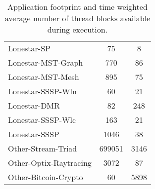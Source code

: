 \begin{table}[t]
\begin{small}
\begin{tabular}{lcc}
Lonestar-SP & 75 & 8 \\
Lonestar-MST-Graph & 770 & 86 \\
Lonestar-MST-Mesh & 895 & 75 \\
Lonestar-SSSP-Wln & 60 & 21 \\
Lonestar-DMR  & 82 & 248 \\
Lonestar-SSSP-Wlc  & 163 & 21 \\
Lonestar-SSSP  & 1046 & 38 \\
Other-Stream-Triad  & 699051 & 3146 \\
Other-Optix-Raytracing  & 3072 & 87 \\
Other-Bitcoin-Crypto  & 60 & 5898 \\
\toprule
\end{tabular}
\vspace{-.1in}
\caption{Application footprint and time weighted average number of thread blocks 
available during execution.}
\vspace{-.2in}
\label{tab:numctas}
\end{small}
\end{table}


